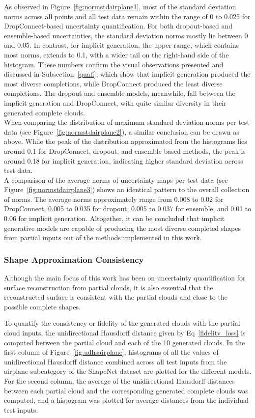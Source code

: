         As observed in Figure~\ref{fig:normstdairplane1}, most of the standard deviation norms across all points and all test data remain within the range of 0 to 0.025 for DropConnect-based uncertainty quantification. For both dropout-based and ensemble-based uncertainties, the standard deviation norms mostly lie between 0 and 0.05. In contrast, for implicit generation, the upper range, which contains most norms, extends to 0.1, with a wider tail on the right-hand side of the histogram. These numbers confirm the visual observations presented and discussed in Subsection~\ref{quali}, which show that implicit generation produced the most diverse completions, while DropConnect produced the least diverse completions. The dropout and ensemble models, meanwhile, fall between the implicit generation and DropConnect, with quite similar diversity in their generated complete clouds.
        \\
        When comparing the distribution of maximum standard deviation norms per test data (see Figure~\ref{fig:normstdairplane2}), a similar conclusion can be drawn as above. While the peak of the distribution approximated from the histograms lies around 0.1 for DropConnect, dropout, and ensemble-based methods, the peak is around 0.18 for implicit generation, indicating higher standard deviation across test data.
        \\
        A comparison of the average norms of uncertainty maps per test data (see Figure~\ref{fig:normstdairplane3}) shows an identical pattern to the overall collection of norms. The average norms approximately range from 0.008 to 0.02  for DropConnect, 0.005 to 0.035 for dropout, 0.005 to 0.037 for ensemble, and 0.01 to 0.06 for implicit generation. Altogether, it can be concluded that implicit generative models are capable of producing the most diverse completed shapes from partial inputs out of the methods implemented in this work.
        
        \subsubsection{Shape Approximation Consistency}
        Although the main focus of this work has been on uncertainty quantification for surface reconstruction from partial clouds, it is also essential that the reconstructed surface is consistent with the partial clouds and close to the possible complete shapes. 
        \newline
        
        To quantify the consistency or fidelity of the generated clouds with the partial cloud inputs, the unidirectional Hausdorff distance given by Eq~\ref{fidelity_loss} is computed between the partial cloud and each of the 10 generated clouds. In the first column of Figure~\ref{fig:udhsairplane}, histograms of all the values of unidirectional Hausdorff distance combined across all test inputs from the airplane subcategory of the ShapeNet dataset are plotted for the different models. For the second column, the average of the unidirectional Hausdorff distances between each partial cloud and the corresponding generated complete clouds was computed, and a histogram was plotted for average distances from the individual test inputs.

